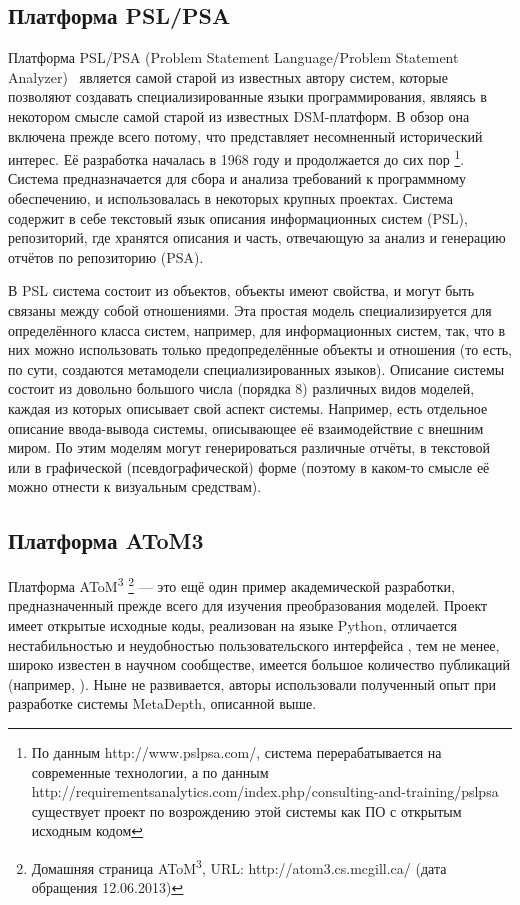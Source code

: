 \subsection{Платформа PSL/PSA}
Платформа PSL/PSA (Problem Statement Language/Problem Statement Analyzer)~\cite{teichroew1977psl} 
является самой старой из известных автору систем, которые позволяют создавать специализированные языки программирования, являясь в некотором
смысле самой старой из известных DSM-платформ. В обзор она включена прежде всего потому, 
что представляет несомненный исторический интерес. Её разработка началась в 1968 году и продолжается до сих пор
\footnote{По данным http://www.pslpsa.com/, система перерабатывается на современные технологии,
а по данным http://requirementsanalytics.com/index.php/consulting-and-training/pslpsa 
существует проект по возрождению этой системы как ПО с открытым исходным кодом}. Система 
предназначается для сбора и анализа требований к программному обеспечению, и использовалась в некоторых крупных
проектах. Система содержит в себе текстовый язык описания информационных систем (PSL), репозиторий, 
где хранятся описания и часть, отвечающую за анализ и генерацию отчётов по репозиторию (PSA).

В PSL система состоит из объектов, объекты имеют свойства, и могут быть связаны между 
собой отношениями. Эта простая модель специализируется для определённого класса систем, 
например, для информационных систем, так, что в них можно использовать только предопределённые 
объекты и отношения (то есть, по сути, создаются метамодели специализированных языков). 
Описание системы состоит из довольно большого числа (порядка 8) различных видов моделей, 
каждая из которых описывает свой аспект системы. Например, есть отдельное описание ввода-вывода 
системы, описывающее её взаимодействие с внешним миром. По этим моделям могут генерироваться 
различные отчёты, в текстовой или в графической (псевдографической) форме (поэтому в каком-то смысле
её можно отнести к визуальным средствам).

\subsection{Платформа AToM3}
Платформа AToM\textsuperscript{3}
\footnote{Домашняя страница AToM\textsuperscript{3}, URL: http://atom3.cs.mcgill.ca/ (дата обращения 12.06.2013)}
--- это ещё один пример академической разработки, предназначенный прежде всего для изучения преобразования моделей. Проект имеет открытые 
исходные коды, реализован на языке Python, отличается нестабильностью и неудобностью пользовательского интерфейса
, тем не менее, широко известен в научном сообществе, имеется большое количество публикаций (например, \cite{vangheluwe2004domain}).
Ныне не развивается, авторы использовали полученный опыт при разработке системы MetaDepth, описанной выше.

